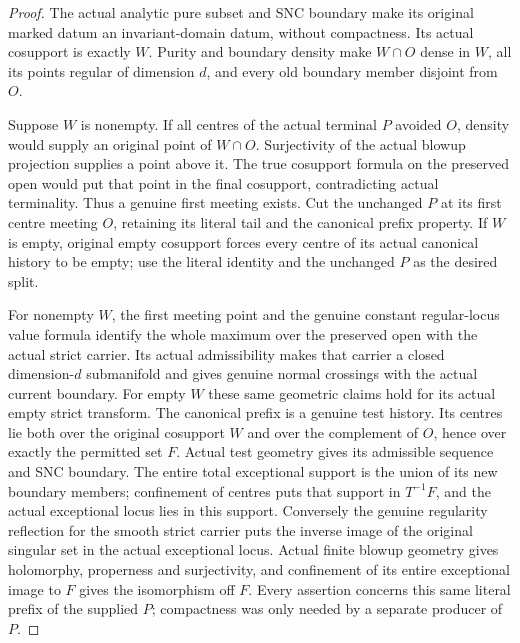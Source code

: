 \begin{proof}
The actual analytic pure subset and SNC boundary make its original
marked datum an invariant-domain datum, without compactness. Its actual
cosupport is exactly $W$. Purity and boundary density make $W\cap O$
dense in $W$, all its points regular of dimension $d$, and every old
boundary member disjoint from $O$.

Suppose $W$ is nonempty. If all centres of the actual terminal $P$
avoided $O$, density would supply an original point of $W\cap O$.
Surjectivity of the actual blowup projection supplies a point above it.
The true cosupport formula on the preserved open would put that point
in the final cosupport, contradicting actual terminality. Thus a genuine
first meeting exists. Cut the unchanged $P$ at its first centre meeting
$O$, retaining its literal tail and the canonical prefix property.
If $W$ is empty, original empty cosupport forces every centre of its
actual canonical history to be empty; use the literal identity and the
unchanged $P$ as the desired split.

For nonempty $W$, the first meeting point and the genuine constant
regular-locus value formula identify the whole maximum over the
preserved open with the actual strict carrier. Its actual admissibility
makes that carrier a closed dimension-$d$ submanifold and gives genuine
normal crossings with the actual current boundary. For empty $W$ these
same geometric claims hold for its actual empty strict transform.
The canonical prefix is a genuine test history. Its centres lie both
over the original cosupport $W$ and over the complement of $O$, hence
over exactly the permitted set $F$. Actual test geometry gives its
admissible sequence and SNC boundary. The entire total exceptional
support is the union of its new boundary members; confinement of
centres puts that support in $T^{-1}F$, and the actual exceptional locus
lies in this support. Conversely the genuine regularity reflection for
the smooth strict carrier puts the inverse image of the original
singular set in the actual exceptional locus. Actual finite blowup
geometry gives holomorphy, properness and surjectivity, and confinement
of its entire exceptional image to $F$ gives the isomorphism off $F$.
Every assertion concerns this same literal prefix of the supplied $P$;
compactness was only needed by a separate producer of $P$.
\end{proof}
